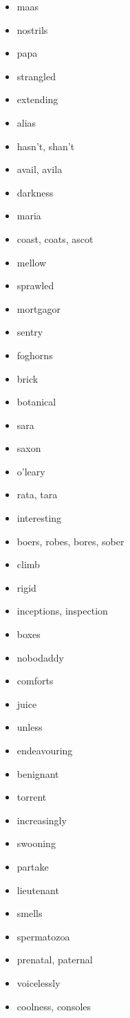 \documentclass{article}
\begin{document}
\begin{itemize}
    \item maas
    \item nostrils
    \item papa
    \item strangled
    \item extending
    \item alias
    \item hasn't, shan't
    \item avail, avila
    \item darkness
    \item maria
    \item coast, coats, ascot
    \item mellow
    \item sprawled
    \item mortgagor
    \item sentry
    \item foghorns
    \item brick
    \item botanical
    \item sara
    \item saxon
    \item o'leary
    \item rata, tara
    \item interesting
    \item boers, robes, bores, sober
    \item climb
    \item rigid
    \item inceptions, inspection
    \item boxes
    \item nobodaddy
    \item comforts
    \item juice
    \item unless
    \item endeavouring
    \item benignant
    \item torrent
    \item increasingly
    \item swooning
    \item partake
    \item lieutenant
    \item smells
    \item spermatozoa
    \item prenatal, paternal
    \item voicelessly
    \item coolness, consoles

\end{itemize}
\end{document}
